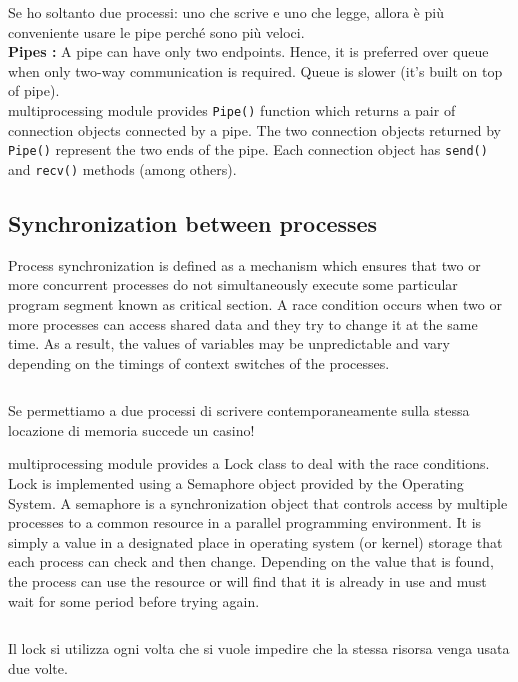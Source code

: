 Se ho soltanto due processi: uno che scrive e uno che legge, allora è più conveniente usare le pipe perché sono più veloci.\\

\textbf{Pipes :} A pipe can have only two endpoints. Hence, it is preferred over queue when only two-way communication is required. Queue is slower (it’s built on top of pipe).\\

multiprocessing module provides \texttt{Pipe()} function which returns a pair of connection objects connected by a pipe.
The two connection objects returned by \texttt{Pipe()} represent the two ends of the pipe.
Each connection object has \texttt{send()} and \texttt{recv()} methods (among others).


\subsection{Synchronization between processes}

Process synchronization is defined as a mechanism which ensures that two or more concurrent processes do not simultaneously execute some particular program segment known as critical section. A race condition occurs when two or more processes can access shared data and they try to change it at the same time. As a result, the values of variables may be unpredictable and vary depending on the timings of context switches of the processes.

\inputminted{python}{python_parallel/synchro1.py}


Se permettiamo a due processi di scrivere contemporaneamente sulla stessa locazione di memoria succede un casino!

multiprocessing module provides a Lock class to deal with the race conditions. Lock is implemented using a Semaphore object provided by the Operating System. A semaphore is a synchronization object that controls access by multiple processes to a common resource in a parallel programming environment. It is simply a value in a designated place in operating system (or kernel) storage that each process can check and then change. Depending on the value that is found, the process can use the resource or will find that it is already in use and must wait for some period before trying again.

\inputminted{python}{python_parallel/synchro2.py}

Il lock si utilizza ogni volta che si vuole impedire che la stessa risorsa venga usata due volte.


